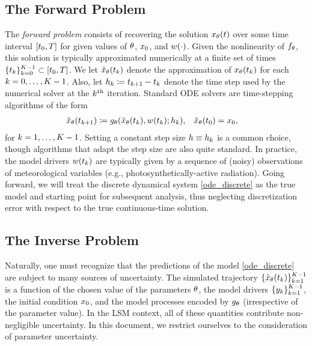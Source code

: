 \documentclass[12pt]{article}
\begin{document}
\subsection{The Forward Problem}
The \textit{forward problem} consists of recovering the solution $\state_{\Par}(\Time)$ over some time interval $[\timeInit, \timeEnd]$ for given 
values of $\Par$, $\stateInit$, and $\forcing(\cdot)$. Given the nonlinearity of $\funcODE_{\Par}$, this solution is typically approximated 
numerically at a finite set of times $\{\indexTime{\Time}\}_{\timeIdx=0}^{\Ntime-1} \subset [\timeInit, \timeEnd]$. We 
let $\stateApprox_{\Par}(\indexTime{\Time})$ denote the approximation of $\state_{\Par}(\indexTime{\Time})$ for each 
$\timeIdx = 0, \dots, \Ntime-1$. Also, let $\indexTime{\timeStep} \Def \indexTime[\timeIdx+1]{\Time} - \indexTime{\Time}$ denote the 
time step used by the numerical solver at the $\timeIdx^{\text{th}}$ iteration. Standard ODE solvers are time-stepping algorithms of the 
form 
\begin{align}
&\stateApprox_{\Par}(\indexTime[\timeIdx+1]{\Time}) \Def \fwdOne_{\Par}(\stateApprox_{\Par}(\indexTime{\Time}), \forcing(\indexTime{\Time}); \indexTime{\timeStep}), 
&&\stateApprox_{\Par}(\indexTime[0]{\Time}) = \stateInit, \label{ode_discrete}
\end{align}
for $\timeIdx = 1, \dots, \Ntime-1$. Setting a constant step size $\timeStep \equiv \indexTime{\timeStep}$ is a common choice, though 
algorithms that adapt the step size are also quite standard. In practice, the model drivers $\forcing(\indexTime{\Time})$
are typically given by a sequence of (noisy) observations of meteorological variables (e.g., photosynthetically-active radiation).
Going forward, we will treat the discrete dynamical system \ref{ode_discrete} as 
the true model and starting point for subsequent analysis, thus neglecting discretization error with respect to the true continuous-time solution. 

\subsection{The Inverse Problem}
Naturally, one must recognize that the predictions of the model \ref{ode_discrete} are subject to many sources of uncertainty. 
The simulated trajectory $\{\stateApprox_{\Par}(\indexTime{\Time})\}_{\timeIdx=1}^{\Ntime-1}$ is a function of  
the chosen value of the parameters $\Par$, the model drivers  $\{\indexTime{\obs}\}_{\timeIdx=1}^{\Ntime-1}$, the initial condition $\stateInit$, 
and the model processes encoded by $\fwdOne_{\Par}$ (irrespective of the parameter value). In the LSM context, 
all of these quantities contribute non-negligible uncertainty. 
In this document, we restrict ourselves to the consideration of parameter uncertainty. 
\end{document}
